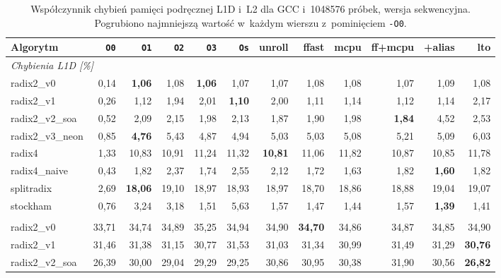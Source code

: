 \begin{table}[H]
\centering
\caption{Współczynnik chybień pamięci podręcznej L1D i~L2 dla GCC i~1048576 próbek, wersja sekwencyjna. Pogrubiono najmniejszą wartość w~każdym wierszu z~pominięciem \texttt{-O0}.}
\label{tab:cache-gcc-1M}
\scriptsize
\setlength{\tabcolsep}{3.0pt}
\begin{tabular}{lrrrrrrrrrrr}
\toprule
Algorytm & \texttt{O0} & \texttt{O1} & \texttt{O2} & \texttt{O3} & \texttt{Os} & unroll & ffast & mcpu & ff+mcpu & +alias & lto \\
\midrule
\multicolumn{12}{l}{\textit{Chybienia L1D [\%]}} \\[2pt]
radix2\_v0 & 0,14 & \textbf{1,06} & 1,08 & \textbf{1,06} & 1,07 & 1,07 & 1,08 & 1,08 & 1,07 & 1,09 & 1,08 \\
radix2\_v1 & 0,26 & 1,12 & 1,94 & 2,01 & \textbf{1,10} & 2,00 & 1,11 & 1,14 & 1,12 & 1,14 & 2,17 \\
radix2\_v2\_soa & 0,52 & 2,09 & 2,15 & 1,98 & 2,13 & 1,87 & 1,90 & 1,98 & \textbf{1,84} & 4,52 & 2,53 \\
radix2\_v3\_neon & 0,85 & \textbf{4,76} & 5,43 & 4,87 & 4,94 & 5,03 & 5,03 & 5,08 & 5,21 & 5,09 & 6,03 \\
radix4 & 1,33 & 10,83 & 10,91 & 11,24 & 11,32 & \textbf{10,81} & 11,06 & 11,82 & 10,87 & 10,85 & 11,78 \\
radix4\_naive & 0,43 & 1,82 & 2,37 & 1,74 & 2,55 & 2,12 & 1,72 & 1,63 & 1,82 & \textbf{1,60} & 1,82 \\
splitradix & 2,69 & \textbf{18,06} & 19,10 & 18,97 & 18,93 & 18,97 & 18,70 & 18,86 & 18,88 & 19,04 & 19,07 \\
stockham & 0,76 & 3,24 & 3,18 & 1,51 & 5,63 & 1,57 & 1,47 & 1,44 & 1,57 & \textbf{1,39} & 1,41 \\
\addlinespace
\multicolumn{12}{l}{\textit{Chybienia L2 [\%]}} \\[2pt]
radix2\_v0 & 33,71 & 34,74 & 34,89 & 35,25 & 34,94 & 34,90 & \textbf{34,70} & 34,86 & 34,87 & 34,85 & 34,90 \\
radix2\_v1 & 31,46 & 31,38 & 31,15 & 30,77 & 31,53 & 31,03 & 31,34 & 30,99 & 31,49 & 31,29 & \textbf{30,76} \\
radix2\_v2\_soa & 26,39 & 30,00 & 29,04 & 29,29 & 29,25 & 30,86 & 30,95 & 30,38 & 31,90 & 30,56 & \textbf{26,82} \\

\end{tabular}
\end{table}
